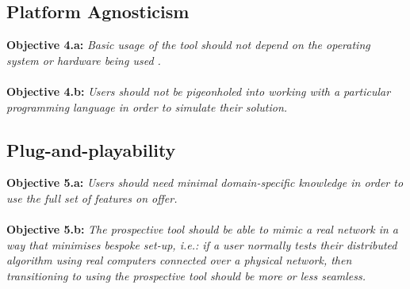 \subsection{Platform Agnosticism}\label{subsection:platform_agnosticism}

\textbf{Objective 4.a: }\emph{Basic usage of the tool should not depend on the operating system or hardware being used
.} \\ \\
\textbf{Objective 4.b: }\emph{Users should not be pigeonholed into working with a particular programming language in
order to
simulate their solution.}

\subsection{Plug-and-playability}\label{subsection:plug_and_playability}

\textbf{Objective 5.a: }\emph{Users should need minimal domain-specific knowledge in order to use the full set of
features on offer.} \\ \\
\textbf{Objective 5.b: }\emph{The prospective tool should be able to mimic a real network in a way that minimises
bespoke set-up, i.e.: if a user normally tests their distributed algorithm using real computers connected over a
physical network, then transitioning to using the prospective tool should be more or less seamless.}
